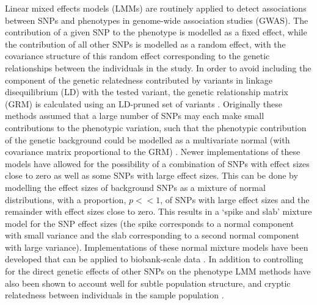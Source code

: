 \documentclass[doublespacing]{bmcart}
\begin{document}
Linear mixed effects models (LMMs) are routinely applied to detect associations between SNPs and phenotypes in genome-wide association studies (GWAS). The contribution of a given SNP to the phenotype is modelled as a fixed effect, while the contribution of all other SNPs is modelled as a random effect, with the covariance structure of this random effect corresponding to the genetic relationships between the individuals in the study. In order to avoid including the component of the genetic relatedness contributed by variants in linkage disequilibrium (LD) with the tested variant, the genetic relationship matrix (GRM) is calculated using an LD-pruned set of variants \cite{yu2006unified,emma}. Originally these methods assumed that a large number of SNPs may each make small contributions to the phenotypic variation, such that the phenotypic contribution of the genetic background could be modelled as a multivariate normal (with covariance matrix proportional to the GRM) \cite{emma, emmax,gemma,fastlmm}. Newer implementations of these models have allowed for the possibility of a combination of SNPs with effect sizes close to zero as well as some SNPs with large effect sizes. This can be done by modelling the effect sizes of background SNPs as a mixture of normal distributions, with a proportion, $p << 1$, of SNPs with large effect sizes and the remainder with effect sizes close to zero. This results in a ‘spike and slab’ mixture model for the SNP effect sizes \cite{BOLT} (the spike corresponds to a normal component with small variance and the slab corresponding to a second normal component with large variance). Implementations of these normal mixture models have been developed that can be applied to biobank-scale data \cite{boltukb}. In addition to controlling for the direct genetic effects of other SNPs on the phenotype LMM methods have also been shown to account well for subtle population structure, and cryptic relatedness between individuals in the sample population \cite{yu2006unified,emma,emmax,gemma,price2010new}.  

 \par
\end{document}
